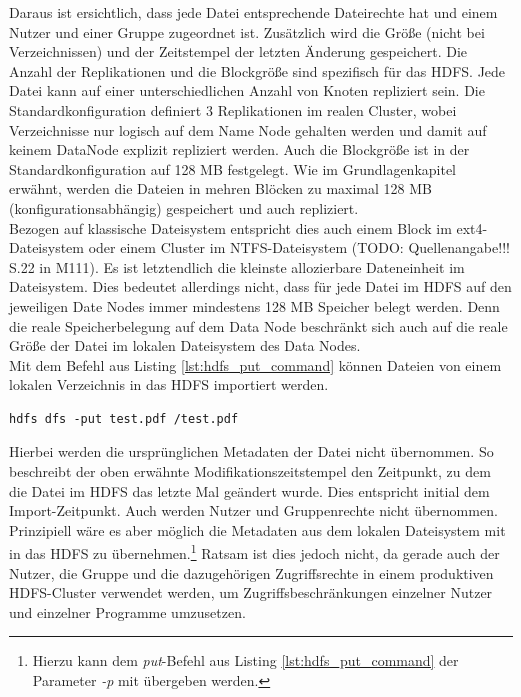 \noindent
Daraus ist ersichtlich, dass jede Datei entsprechende Dateirechte hat und einem Nutzer und einer Gruppe zugeordnet ist. Zusätzlich wird die Größe (nicht bei Verzeichnissen) und der Zeitstempel der letzten Änderung gespeichert. Die Anzahl der Replikationen und die Blockgröße sind spezifisch für das HDFS. Jede Datei kann auf einer unterschiedlichen Anzahl von Knoten repliziert sein. Die Standardkonfiguration definiert 3 Replikationen im realen Cluster, wobei Verzeichnisse nur logisch auf dem Name Node gehalten werden und damit auf keinem DataNode explizit repliziert werden. Auch die Blockgröße ist in der Standardkonfiguration auf 128 MB festgelegt. Wie im Grundlagenkapitel erwähnt, werden die Dateien in mehren Blöcken zu maximal 128 MB (konfigurationsabhängig) gespeichert und auch repliziert.\\ Bezogen auf klassische Dateisystem entspricht dies auch einem Block im ext4-Dateisystem oder einem Cluster im NTFS-Dateisystem (TODO: Quellenangabe!!! S.22 in M111). Es ist letztendlich die kleinste allozierbare Dateneinheit im Dateisystem. Dies bedeutet allerdings nicht, dass für jede Datei im HDFS auf den jeweiligen Date Nodes immer mindestens 128 MB Speicher belegt werden. Denn die reale Speicherbelegung auf dem Data Node beschränkt sich auch auf die reale Größe der Datei im lokalen Dateisystem des Data Nodes.\\

\noindent
Mit dem Befehl aus Listing \ref{lst:hdfs_put_command} können Dateien von einem lokalen Verzeichnis in das HDFS importiert werden. 
\begin{lstlisting}[label={lst:hdfs_put_command},caption= Befehl zum Speichern einer Datei im HDFS,captionpos=b,frame=single,style=customshell]
hdfs dfs -put test.pdf /test.pdf
\end{lstlisting}
Hierbei werden die ursprünglichen Metadaten der Datei nicht übernommen. So beschreibt der oben erwähnte Modifikationszeitstempel den Zeitpunkt, zu dem die Datei im HDFS das letzte Mal geändert wurde. Dies entspricht initial dem Import-Zeitpunkt. Auch werden Nutzer und Gruppenrechte nicht übernommen. Prinzipiell wäre es aber möglich die Metadaten aus dem lokalen Dateisystem mit in das HDFS zu übernehmen.\footnote{Hierzu kann dem \textit{put}-Befehl aus Listing \ref{lst:hdfs_put_command} der Parameter \textit{-p} mit übergeben werden.} Ratsam ist dies jedoch nicht, da gerade auch der Nutzer, die Gruppe und die dazugehörigen Zugriffsrechte in einem produktiven HDFS-Cluster verwendet werden, um Zugriffsbeschränkungen einzelner Nutzer und einzelner Programme umzusetzen.\\


